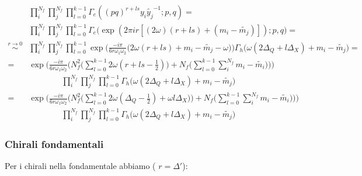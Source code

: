 \documentclass[a4paper,12pt]{article}
\begin{document}
\begin{align*}
&\prod_i^{N_f} \prod_j^{N_f}  \prod_{l=0}^{k-1} \Gamma_e ( (pq)^{r + l s} y_i \tilde{y_j}^{-1}; p ,q)  = \\
& \prod_i^{N_f} \prod_j^{N_f}  \prod_{l=0}^{k-1} \Gamma_e \big ( \exp( 2 \pi i r [(2 \omega)(r + l s) +  ( m_i - \tilde{m_j})]); p ,q \big)  = \\
\overset{ r\rightarrow 0 }{ \sim } &  \prod_i^{N_f} \prod_j^{N_f}  \prod_{l=0}^{k-1} \exp \bigg( \frac{- i \pi }{6 r \omega_1 \omega_2} \big( 2 \omega ( r + l s ) + m_i - \tilde{m_j} - \omega \big) \bigg) \Gamma_h \big( \omega ( 2 \Delta_Q + l \Delta_X) + m_i - \tilde{m_j} \big)   = \\
= &  \exp \bigg( \frac{- i \pi }{6 r \omega_1 \omega_2} \big(  N_f^2  \bigg( \sum _{l=0}^{k-1} 2 \omega ( r + l s - \frac{1}{2}  )\bigg)  +N_f \big( \sum_{l=0}^{k-1} \sum_i^{N_f} m_i - \tilde{m_i}\big) \big) \bigg) \\
&\qquad \qquad  \prod_i^{N_f} \prod_j^{N_f}  \prod_{l=0}^{k-1}  \Gamma_h \big( \omega ( 2 \Delta_Q + l  \Delta_X) + m_i -  \tilde{m_j} \big)  \\
= &  \exp \bigg( \frac{- i \pi }{6 r \omega_1 \omega_2} \big(  N_f^2  \bigg( \sum _{l=0}^{k-1} 2 \omega ( \Delta_Q - \frac{1}{2}) + \omega l \Delta_X   )\bigg)  +N_f \big( \sum_{l=0}^{k-1} \sum_i^{N_f} m_i - \tilde{m_i}\big) \big) \bigg) \\
&\qquad \qquad  \prod_i^{N_f} \prod_j^{N_f}  \prod_{l=0}^{k-1}  \Gamma_h \big( \omega ( 2 \Delta_Q + l \Delta_X) + m_i - \tilde{m_j} \big)  
\end{align*}

\subsubsection*{Chirali fondamentali}
Per i chirali nella fondamentale abbiamo ( $r = \Delta'$):
\end{document}
